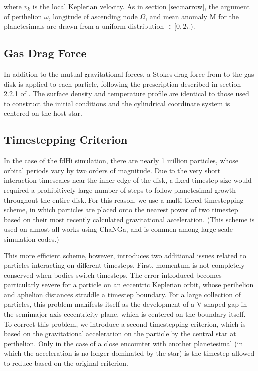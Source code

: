 \documentclass[twocolumn]{aastex63}
\begin{document}
\noindent where $v_{k}$ is the local Keplerian velocity. As in section
\ref{sec:narrow}, the argument of perihelion $\omega$, longitude of
ascending node $\Omega$, and mean anomaly M for the planetesimals are drawn from a uniform distribution $\in [0, 2 \pi)$.

\subsection{Gas Drag Force}

In addition to the mutual gravitational forces, a Stokes drag force from to the gas disk is applied to each particle, following the prescription described in section 2.2.1 of \citet{morishima10}. The surface density and temperature profile are identical to those used to construct the initial conditions and the cylindrical coordinate system is centered on the host star.

\subsection{Timestepping Criterion}

In the case of the fdHi simulation, there are nearly 1 million
particles, whose orbital periods vary by two orders of magnitude. Due
to the very short interaction timescales near the inner edge of the
disk, a fixed timestep size would required a prohibitively large
number of steps to follow planetesimal growth throughout the entire
disk. For this reason, we use a multi-tiered timestepping scheme, in
which particles are placed onto the nearest power of two timestep
based on their most recently calculated gravitational
acceleration. (This scheme is used on almost all works using ChaNGa,
and is common among large-scale simulation codes.)

This more efficient scheme, however, introduces two additional issues
related to particles interacting on different timesteps. First,
momentum is not completely conserved when bodies switch timesteps. The
error introduced becomes particularly severe for a particle on an
eccentric Keplerian orbit, whose perihelion and aphelion distances
straddle a timestep boundary. For a large collection of particles,
this problem manifests itself as the development of a V-shaped gap in the semimajor axis-eccentricity plane, which is centered on the boundary itself. To correct this problem, we introduce a second timestepping criterion, which is based on the gravitational acceleration on the particle by the central star at perihelion. Only in the case of a close encounter with another planetesimal (in which the acceleration is no longer dominated by the star) is the timestep allowed to reduce based on the original criterion.
\end{document}
